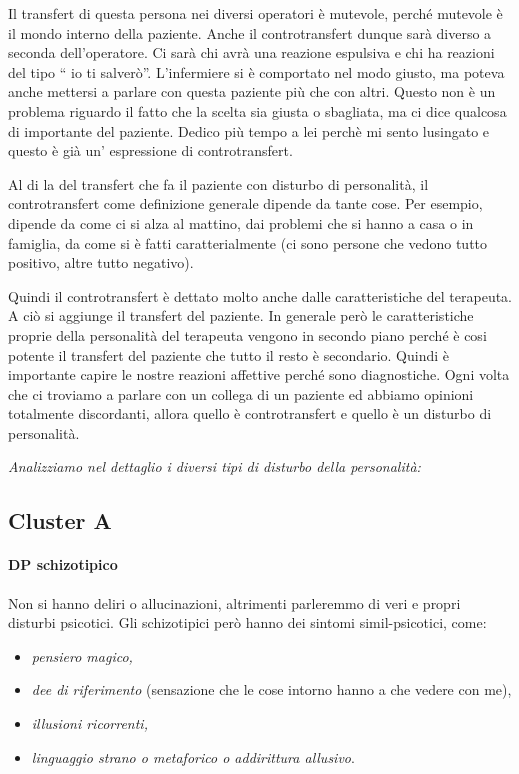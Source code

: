 Il transfert di questa persona nei diversi operatori è mutevole, perché
mutevole è il mondo interno della paziente. Anche il controtransfert
dunque sarà diverso a seconda dell'operatore. Ci sarà chi avrà una
reazione espulsiva e chi ha reazioni del tipo `` io ti salverò''.
L'infermiere si è comportato nel modo giusto, ma poteva anche mettersi a
parlare con questa paziente più che con altri. Questo non è un problema
riguardo il fatto che la scelta sia giusta o sbagliata, ma ci dice
qualcosa di importante del paziente. Dedico più tempo a lei perchè mi
sento lusingato e questo è già un' espressione di controtransfert.

Al di la del transfert che fa il paziente con disturbo di personalità,
il controtransfert come definizione generale dipende da tante cose. Per
esempio, dipende da come ci si alza al mattino, dai problemi che si
hanno a casa o in famiglia, da come si è fatti caratterialmente (ci sono
persone che vedono tutto positivo, altre tutto negativo).

Quindi il controtransfert è dettato molto anche dalle caratteristiche
del terapeuta. A ciò si aggiunge il transfert del paziente. In generale
però le caratteristiche proprie della personalità del terapeuta vengono
in secondo piano perché è cosi potente il transfert del paziente che
tutto il resto è secondario. Quindi è importante capire le nostre
reazioni affettive perché sono diagnostiche. Ogni volta che ci troviamo
a parlare con un collega di un paziente ed abbiamo opinioni totalmente
discordanti, allora quello è controtransfert e quello è un disturbo di
personalità.

\emph{Analizziamo nel dettaglio i diversi tipi di disturbo della
personalità:}

\subsection{Cluster A}

\paragraph{DP schizotipico}

Non si hanno deliri o allucinazioni, altrimenti parleremmo di veri e
propri disturbi psicotici. Gli schizotipici però hanno dei sintomi
simil-psicotici, come:

\begin{itemize}
\item \emph{pensiero magico,}
\item \emph{dee di riferimento} (sensazione che le cose intorno hanno a che vedere con me),
\item \emph{illusioni ricorrenti,}
\item \emph{linguaggio strano o metaforico o addirittura allusivo}.
\end{itemize}

